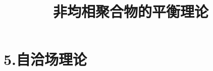\documentclass[12pt,a4paper]{article}
\title{非均相聚合物的平衡理论}
\author{}
\date{\chntoday}
\numberwithin{equation}{section}
\begin{document}
\maketitle
\section{}
\section{}
\section{}
\section{}
\section{5.自洽场理论}






\cite{tam19912d}

\end{document}
